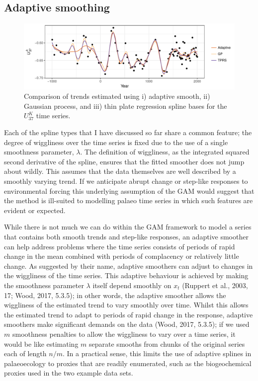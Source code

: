 \documentclass[12pt,]{article}
\newcommand{\uk}{\ensuremath{\mathit{U}^{\mathit{K}}_{\mathup{37}}}}
\begin{document}
\subsection{Adaptive smoothing}\label{adaptive-smoothing}

\begin{figure}

{\centering \includegraphics[width=0.8\linewidth]{manuscript_files/figure-latex/braya-so-model-comparisons-1} 

}

\caption{Comparison of trends estimated using i) adaptive smooth, ii) Gaussian process, and iii) thin plate regression spline bases for the \uk{} time series.}\label{fig:braya-so-model-comparisons}
\end{figure}

Each of the spline types that I have discussed so far share a common
feature; the degree of wiggliness over the time series is fixed due to
the use of a single smoothness parameter, \(\lambda\). The definition of
wiggliness, as the integrated squared second derivative of the spline,
ensures that the fitted smoother does not jump about wildly. This
assumes that the data themselves are well described by a smoothly
varying trend. If we anticipate abrupt change or step-like responses to
environmental forcing this underlying assumption of the GAM would
suggest that the method is ill-suited to modelling palaeo time series in
which such features are evident or expected.

While there is not much we can do within the GAM framework to model a
series that contains both smooth trends and step-like responses, an
adaptive smoother can help address problems where the time series
consists of periods of rapid change in the mean combined with periods of
complacency or relatively little change. As suggested by their name,
adaptive smoothers can adjust to changes in the wiggliness of the time
series. This adaptive behaviour is achieved by making the smoothness
parameter \(\lambda\) itself depend smoothly on \(x_t\) (Ruppert et al.,
2003, 17; Wood, 2017, 5.3.5); in other words, the adaptive smoother
allows the wiggliness of the estimated trend to vary smoothly over time.
Whilst this allows the estimated trend to adapt to periods of rapid
change in the response, adaptive smoothers make significant demands on
the data (Wood, 2017, 5.3.5); if we used \(m\) smoothness penalties to
allow the wiggliness to vary over a time series, it would be like
estimating \(m\) separate smooths from chunks of the original series
each of length \(n/m\). In a practical sense, this limits the use of
adaptive splines in palaeoecology to proxies that are readily
enumerated, such as the biogeochemical proxies used in the two example
data sets.
\end{document}
